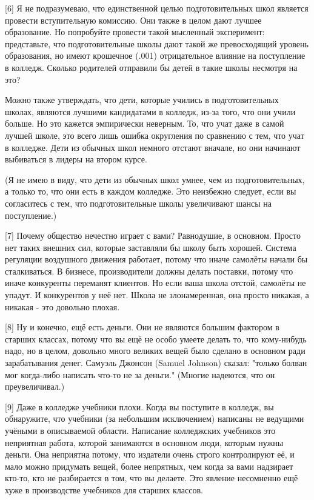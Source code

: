 \documentclass[ebook,12pt,oneside,openany]{memoir}
\begin{document}
[6] Я не подразумеваю, что единственной целью подготовительных школ
является провести вступительную комиссию. Они также в целом дают
лучшее образование. Но попробуйте провести такой мысленный
эксперимент: представьте, что подготовительные школы дают такой же
превосходящий уровень образования, но имеют крошечное (.001)
отрицательное влияние на поступление в колледж. Сколько родителей
отправили бы детей в такие школы несмотря на это?

Можно также утверждать, что дети, которые учились в подготовительных
школах, являются лучшими кандидатами в колледж, из-за того, что они
учили больше. Но это кажется эмпирически неверным. То, что учат даже в
самой лучшей школе, это всего лишь ошибка округления по сравнению с
тем, что учат в колледже. Дети из обычных школ немного отстают
вначале, но они начинают выбиваться в лидеры на втором курсе.

(Я не имею в виду, что дети из обычных школ умнее, чем из
подготовительных, а только то, что они есть в каждом колледже. Это
неизбежно следует, если вы согласитесь с тем, что подготовительные
школы увеличивают шансы на поступление.)

[7] Почему общество нечестно играет с вами? Равнодушие, в основном.
Просто нет таких внешних сил, которые заставляли бы школу быть
хорошей. Система регуляции воздушного движения работает, потому что
иначе самолёты начали бы сталкиваться. В бизнесе, производители должны
делать поставки, потому что иначе конкуренты переманят клиентов. Но
если ваша школа отстой, самолёты не упадут. И конкурентов у неё нет.
Школа не злонамеренная, она просто никакая, а никакая - это довольно
плохая.

[8] Ну и конечно, ещё есть деньги. Они не являются большим фактором в
старших классах, потому что вы ещё не особо умеете делать то, что
кому-нибудь надо, но в целом, довольно много великих вещей было
сделано в основном ради зарабатывания денег. Самуэль Джонсон (Samuel
Johnson) сказал: "только болван мог когда-либо написать что-то не за
деньги." (Многие надеются, что он преувеличивал.)

[9] Даже в колледже учебники плохи. Когда вы поступите в колледж, вы
обнаружите, что учебники (за небольшим исключением) написаны не
ведущими учёными в описываемой области. Написание колледжских
учебников это неприятная работа, которой занимаются в основном люди,
которым нужны деньги. Она неприятна потому, что издатели очень строго
контролируют её, и мало можно придумать вещей, более непрятных, чем
когда за вами надзирает кто-то, кто не разбирается в том, что вы
делаете. Это явление несомненно ещё хуже в производстве учебников для
старших классов.
\end{document}
